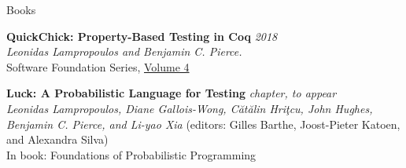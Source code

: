 \documentclass{resume} %
\begin{document}
\begin{rSection}{Books}

  {\bf QuickChick: Property-Based Testing in Coq} \hfill {\em 2018}\\
  {\em Leonidas Lampropoulos and Benjamin C. Pierce.}\\
  {Software Foundation Series, \href{https://softwarefoundations.cis.upenn.edu}{Volume 4}}

  {\bf Luck: A Probabilistic Language for Testing} \hfill {\em chapter, to appear}\\
  {\em Leonidas Lampropoulos, Diane Gallois-Wong, C\u{a}t\u{a}lin Hri\c{t}cu, John Hughes, Benjamin C. Pierce, and Li-yao Xia} {(editors: Gilles Barthe, Joost-Pieter Katoen, and Alexandra Silva)}\\
  In book: {Foundations of Probabilistic Programming} \\

  
\end{rSection}
\end{document}
